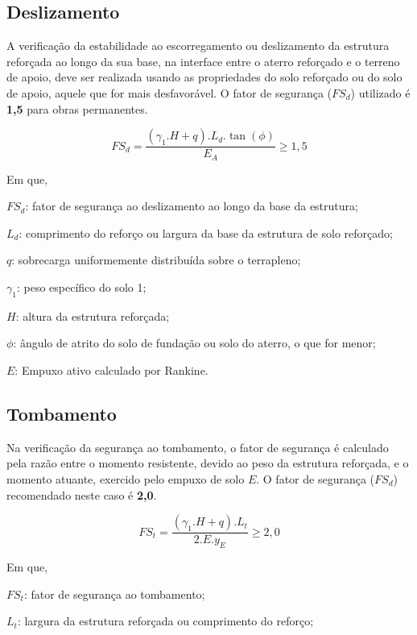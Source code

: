 \subsection{Deslizamento}

A verificação da estabilidade ao escorregamento ou deslizamento da estrutura reforçada ao longo da sua base, na interface entre o aterro reforçado e o terreno de apoio, deve ser realizada usando as propriedades do solo reforçado ou do solo de apoio, aquele que for mais desfavorável. O fator de segurança ($FS_d$) utilizado é \textbf{1,5} para obras permanentes.

\begin{equation}
    FS_d = \frac{(\gamma_1 . H + q) . L_d . \tan(\phi)}{E_A} \geq 1,5
\end{equation}

Em que,

$FS_d$: fator de segurança ao deslizamento ao longo da base da estrutura;

$L_d$: comprimento do reforço ou largura da base da estrutura de solo reforçado;

$q$: sobrecarga uniformemente distribuída sobre o terrapleno;

$\gamma_1$: peso específico do solo 1;

$H$: altura da estrutura reforçada;

$\phi$: ângulo de atrito do solo de fundação ou solo do aterro, o que for menor;

$E$: Empuxo ativo calculado por Rankine.


\subsection{Tombamento}

Na verificação da segurança ao tombamento, o fator de segurança é calculado pela razão entre o momento resistente, devido ao peso da estrutura reforçada, e o momento atuante, exercido pelo empuxo de solo $E$. O fator de segurança ($FS_d$) recomendado neste caso é \textbf{2,0}.
 
 \begin{equation}
    FS_t = \frac{(\gamma_1 . H + q) . L_t}{2 . E . y_E} \geq 2,0
 \end{equation}
 
Em que,

$FS_t$: fator de segurança ao tombamento;

$L_t$: largura da estrutura reforçada ou comprimento do reforço;

